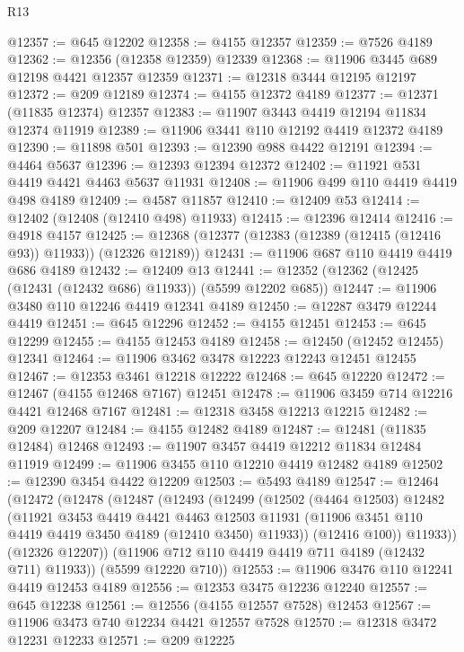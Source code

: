 \begin{lexlean}{R13}
\begin{coremodule}
@12357 := @645 @12202
@12358 := @4155 @12357
@12359 := @7526 @4189
@12362 := @12356 (@12358 @12359) @12339
@12368 := @11906 @3445 @689 @12198 @4421 @12357 @12359
@12371 := @12318 @3444 @12195 @12197
@12372 := @209 @12189
@12374 := @4155 @12372 @4189
@12377 := @12371 (@11835 @12374) @12357
@12383 := @11907 @3443 @4419 @12194 @11834 @12374 @11919
@12389 := @11906 @3441 @110 @12192 @4419 @12372 @4189
@12390 := @11898 @501
@12393 := @12390 @988 @4422 @12191
@12394 := @4464 @5637
@12396 := @12393 @12394 @12372
@12402 := @11921 @531 @4419 @4421 @4463 @5637 @11931
@12408 := @11906 @499 @110 @4419 @4419 @498 @4189
@12409 := @4587 @11857
@12410 := @12409 @53
@12414 := @12402 (@12408 (@12410 @498) @11933)
@12415 := @12396 @12414
@12416 := @4918 @4157
@12425 := @12368 (@12377 (@12383 (@12389 (@12415 (@12416 @93)) @11933)) (@12326 @12189))
@12431 := @11906 @687 @110 @4419 @4419 @686 @4189
@12432 := @12409 @13
@12441 := @12352 (@12362 (@12425 (@12431 (@12432 @686) @11933)) (@5599 @12202 @685))
@12447 := @11906 @3480 @110 @12246 @4419 @12341 @4189
@12450 := @12287 @3479 @12244 @4419
@12451 := @645 @12296
@12452 := @4155 @12451
@12453 := @645 @12299
@12455 := @4155 @12453 @4189
@12458 := @12450 (@12452 @12455) @12341
@12464 := @11906 @3462 @3478 @12223 @12243 @12451 @12455
@12467 := @12353 @3461 @12218 @12222
@12468 := @645 @12220
@12472 := @12467 (@4155 @12468 @7167) @12451
@12478 := @11906 @3459 @714 @12216 @4421 @12468 @7167
@12481 := @12318 @3458 @12213 @12215
@12482 := @209 @12207
@12484 := @4155 @12482 @4189
@12487 := @12481 (@11835 @12484) @12468
@12493 := @11907 @3457 @4419 @12212 @11834 @12484 @11919
@12499 := @11906 @3455 @110 @12210 @4419 @12482 @4189
@12502 := @12390 @3454 @4422 @12209
@12503 := @5493 @4189
@12547 := @12464
    (@12472
      (@12478
        (@12487
          (@12493
            (@12499
              (@12502
                (@4464 @12503)
                @12482
                (@11921
                  @3453
                  @4419
                  @4421
                  @4463
                  @12503
                  @11931
                  (@11906 @3451 @110 @4419 @4419 @3450 @4189 (@12410 @3450) @11933))
                (@12416 @100))
              @11933))
          (@12326 @12207))
        (@11906 @712 @110 @4419 @4419 @711 @4189 (@12432 @711) @11933))
      (@5599 @12220 @710))
@12553 := @11906 @3476 @110 @12241 @4419 @12453 @4189
@12556 := @12353 @3475 @12236 @12240
@12557 := @645 @12238
@12561 := @12556 (@4155 @12557 @7528) @12453
@12567 := @11906 @3473 @740 @12234 @4421 @12557 @7528
@12570 := @12318 @3472 @12231 @12233
@12571 := @209 @12225

\end{coremodule}
\end{lexlean}
